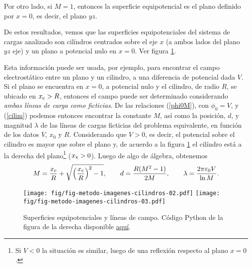 Por otro lado, si $M=1$, entonces la superficie equipotencial es el plano
definido por $x=0$, es decir, el plano $yz$.

De estos resultados, vemos que las superficies equipotenciales del sistema de
cargas analizado son cilíndros centrados sobre el eje $x$ (a ambos lados del
plano $yz$ eje) y un plano a potencial nulo en $x=0$. Ver figura \ref{ci04}.
%

Esta información puede ser usada, por ejemplo, para encontrar el campo
electrostático entre un plano y un cilindro, a una diferencia de potencial
dada $V$. Si el plano se encuentra en $x=0$, a potencial nulo y el cilindro, de
radio $R$, se ubicado en $x_{\rm c}>R$, entonces el campo puede ser determinado
considerando \textit{ambas líneas de carga como ficticias}. De las relaciones
(\ref{phi0M}), con $\phi_0=V$, y (\ref{cilim}) podemos entonces encontrar la
constante $M$, así como la posición, $d$, y magnitud $\lambda$ de las líneas
de cargas ficticias del problema equivalente, en función de los datos $V$,
$x_0$ y $R$. Considerando que $V>0$, es decir, el potencial sobre el cilindro es mayor que sobre el plano y, de acuerdo a la figura \ref{ci04} el cilíndro está a la derecha del plano\footnote{Si $V<0$ la situación es similar, luego de una reflexión respecto al plano $x=0$.} ($x_{\rm x}>0$). Luego de algo de álgebra, obtenemos
\begin{equation}
 M=\frac{x_{\rm c}}{R}+\sqrt{\left(\frac{x_{\rm c}}{R}\right)^2-1}, \qquad
d=\frac{R(M^2-1)}{2M}, \qquad \lambda=\frac{2\pi\varepsilon_0V}{\ln M}.
\end{equation}
\begin{figure}[!h]
\centerline{\texttt{[image: fig/fig-metodo-imagenes-cilindros-02.pdf]}
\hspace{1cm}
\texttt{[image: fig/fig-metodo-imagenes-cilindros-03.pdf]}}
\caption{Superficies equipotenciales y líneas de campo. Código Python de la figura de la derecha disponible \href{https://github.com/gfrubi/electrodinamica/blob/master/figuras-editables/fig-metodo-imagenes-cilindros-03.py}{aquí}.}
\label{ci04}
\end{figure}

